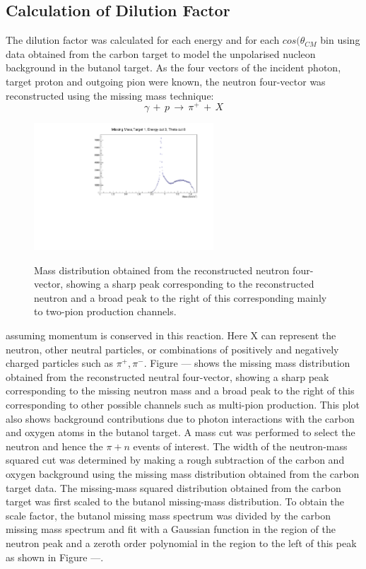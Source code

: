 \subsection{Calculation of Dilution Factor}
The dilution factor was calculated for each energy and for each $cos(\theta_{CM}$ bin using data obtained from the carbon target to model the unpolarised nucleon background in the butanol target.
As the four vectors of the incident photon, target proton and outgoing pion were known, the neutron four-vector was reconstructed using the missing mass technique:
$$
\gamma \, + \,  p \, \rightarrow \, \pi^+ \, + \, X
$$
\begin{figure}[htb]
  \begin{center}
    \includegraphics[width=0.6\textwidth]{figures/neutron_missingmass.pdf} \\
    \caption{Mass distribution obtained from the reconstructed neutron four-vector, showing a sharp peak corresponding to the reconstructed neutron and
a broad peak to the right of this corresponding mainly to two-pion production channels. }
    \label{fig:frost_neutronmissing_ex}
  \end{center}
\end{figure}
assuming momentum is conserved in this reaction. Here X can represent the neutron, other neutral particles, or combinations of positively and negatively charged particles such as $\pi^+ , \pi^-$. Figure --- shows the missing mass distribution obtained from the reconstructed neutral four-vector, showing a sharp peak corresponding to the missing neutron mass and a broad peak to the right of this corresponding to other possible channels such as multi-pion production. This plot also shows background contributions due to photon interactions with the carbon and oxygen atoms in the butanol target.
A mass cut was performed to select the neutron and hence the $\pi + n$ events of interest. The width of the neutron-mass squared cut was determined by making a rough subtraction of the carbon and oxygen background using the missing mass distribution obtained from the carbon target data. The missing-mass squared distribution obtained from the carbon target was first scaled to the butanol missing-mass distribution. To obtain the scale factor, the butanol missing mass spectrum was divided by the carbon missing mass spectrum and fit with a Gaussian function in the region of the neutron peak and a zeroth order polynomial in the region to the left of this peak as shown in Figure ---.
